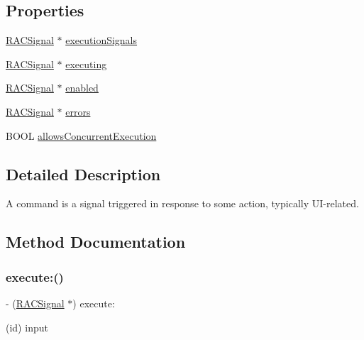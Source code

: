 \subsection*{Properties}
\begin{DoxyCompactItemize}
\item 
\mbox{\hyperlink{interface_r_a_c_signal}{R\+A\+C\+Signal}} $\ast$ \mbox{\hyperlink{interface_r_a_c_command_aba3b25961f8dbe662cafa205bfe1370b}{execution\+Signals}}
\item 
\mbox{\hyperlink{interface_r_a_c_signal}{R\+A\+C\+Signal}} $\ast$ \mbox{\hyperlink{interface_r_a_c_command_a96244456fca773fa72936a8206a3b00b}{executing}}
\item 
\mbox{\hyperlink{interface_r_a_c_signal}{R\+A\+C\+Signal}} $\ast$ \mbox{\hyperlink{interface_r_a_c_command_a34d3f1914d4599329c0077690a0872ab}{enabled}}
\item 
\mbox{\hyperlink{interface_r_a_c_signal}{R\+A\+C\+Signal}} $\ast$ \mbox{\hyperlink{interface_r_a_c_command_a7bff8828bf8a855e9e4970dd56bc7bc3}{errors}}
\item 
B\+O\+OL \mbox{\hyperlink{interface_r_a_c_command_a303b2d58c44d1d82e07a56fbd307f84a}{allows\+Concurrent\+Execution}}
\end{DoxyCompactItemize}


\subsection{Detailed Description}
A command is a signal triggered in response to some action, typically U\+I-\/related. 

\subsection{Method Documentation}
\mbox{\label{interface_r_a_c_command_a91d8d0063d512d5989382e89013a0d74}} 
\subsubsection{\texorpdfstring{execute\+:()}{execute:()}\hspace{0.1cm}{\footnotesize\ttfamily [1/3]}}
{\footnotesize\ttfamily -\/ (\mbox{\hyperlink{interface_r_a_c_signal}{R\+A\+C\+Signal}} $\ast$) execute\+: \begin{DoxyParamCaption}\item[{(id)}]{input }\end{DoxyParamCaption}}

